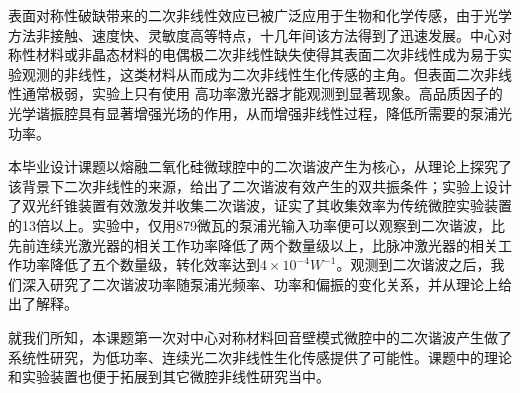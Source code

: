 \begin{cabstract}
表面对称性破缺带来的二次非线性效应已被广泛应用于生物和化学传感，由于光学方法非接触、速度快、灵敏度高等特点，十几年间该方法得到了迅速发展。中心对称性材料或非晶态材料的电偶极二次非线性缺失使得其表面二次非线性成为易于实验观测的非线性，这类材料从而成为二次非线性生化传感的主角。但表面二次非线性通常极弱，实验上只有使用 高功率激光器才能观测到显著现象。高品质因子的光学谐振腔具有显著增强光场的作用，从而增强非线性过程，降低所需要的泵浦光功率。

本毕业设计课题以熔融二氧化硅微球腔中的二次谐波产生为核心，从理论上探究了该背景下二次非线性的来源，给出了二次谐波有效产生的双共振条件；实验上设计了双光纤锥装置有效激发并收集二次谐波，证实了其收集效率为传统微腔实验装置的13倍以上。实验中，仅用879微瓦的泵浦光输入功率便可以观察到二次谐波，比先前连续光激光器的相关工作功率降低了两个数量级以上，比脉冲激光器的相关工作功率降低了五个数量级，转化效率达到$4\times10^{-4}W^{-1}$。观测到二次谐波之后，我们深入研究了二次谐波功率随泵浦光频率、功率和偏振的变化关系，并从理论上给出了解释。

就我们所知，本课题第一次对中心对称材料回音壁模式微腔中的二次谐波产生做了系统性研究，为低功率、连续光二次非线性生化传感提供了可能性。课题中的理论和实验装置也便于拓展到其它微腔非线性研究当中。


\end{cabstract}


